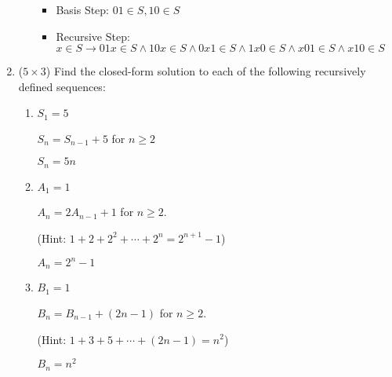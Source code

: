 \documentclass[12pt]{article}
\begin{document}
\begin{enumerate}
\begin{enumerate}
		\begin{itemize}
			\item Basis Step: $01 \in S, 10 \in S$
			\item Recursive Step: $x \in S \to 01x \in S \land 10x \in S \land 0x1 \in S \land 1x0 \in S \land x01 \in S \land x10 \in S$
		\end{itemize}
	\end{enumerate}

		\newpage
	\item ($5 \times 3$)
    Find the closed-form solution to each of the following recursively defined sequences:
	\begin{enumerate}
		\item
		$S_1 = 5$

		$S_n = S_{n-1} + 5$ for $n \geq 2$

		$S_n = 5n$
		\item
		$A_1 = 1$

		$A_n = 2A_{n-1} + 1$ for $n \geq 2$.

        (Hint: $1 + 2 + 2^2 + \cdots + 2^n = 2^{n+1} - 1$)

		$A_n = 2^n - 1$
		\item
		$B_1 = 1$

		$B_n = B_{n-1} + (2n - 1)$ for $n \geq 2$.

		(Hint: $1 + 3 + 5 + \cdots + (2n - 1) = n^2$)

		$B_n = n^2$
	\end{enumerate}

\end{enumerate}
\end{document}
